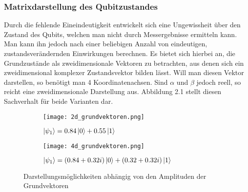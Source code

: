 \documentclass[12pt]{report}
\begin{document}
\subsubsection{Matrixdarstellung des Qubitzustandes}		%
	Durch die fehlende Eineindeutigkeit entwickelt sich eine Ungewissheit über den Zustand des Qubits, welchen man nicht durch Messergebnisse ermitteln kann.
	Man kann ihn jedoch nach einer beliebigen Anzahl von eindeutigen, zustandsverändernden Einwirkungen berechnen. Es bietet sich hierbei an, die Grundzustände als zweidimensionale Vektoren zu betrachten, aus denen sich ein zweidimensional komplexer Zustandsvektor bilden lässt. Will man diesen Vektor darstellen, so benötigt man 4 Koordinatenachsen. Sind $\alpha$ und $\beta$ jedoch reell, so reicht eine zweidimensionale Darstellung aus. Abbildung 2.1 stellt diesen Sachverhalt für beide Varianten dar.\\
	\begin{figure}[h]
		\centering
		\begin{subfigure}{.29\textwidth}
		\centering
  		\texttt{[image: 2d\_grundvektoren.png]}
 	 	\caption{$\ket{\psi_{1}} = 0.84\ket{0} + 0.55\ket{1}$}
		\end{subfigure}
		\begin{subfigure}{.7\textwidth}
  		\centering
 	 	\texttt{[image: 4d\_grundvektoren.png]}
 	 	\caption{$\ket{\psi_{1}} = (0.84+0.32i)\ket{0} + (0.32+0.32i)\ket{1}$}
		\end{subfigure}
		\caption[Caption for LOF]{Darstellungsmöglichkeiten abhängig von den Amplituden der Grundvektoren\protect\footnotemark}
	\end{figure}
	
\newpage	
	
\end{document}
